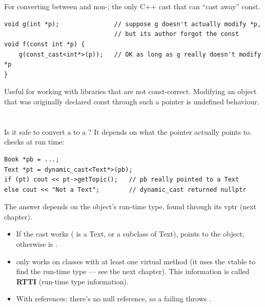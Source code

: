 \section{}
For converting between  and non-; the only C++ cast
that can ``cast away'' const.
\begin{lstlisting}[style=cpp]
void g(int *p);               // suppose g doesn't actually modify *p,
                              // but its author forgot the const
void f(const int *p) {
    g(const_cast<int*>(p));   // OK as long as g really doesn't modify *p
}
\end{lstlisting}
Useful for working with libraries that are not const-correct. Modifying an
object that was originally declared const through such a pointer is undefined
behaviour.

\section{}
Is it safe to convert a  to a ? It depends on what the
pointer actually points to.  checks at run time:
\begin{lstlisting}[style=cpp]
Book *pb = ...;
Text *pt = dynamic_cast<Text*>(pb);
if (pt) cout << pt->getTopic();   // pb really pointed to a Text
else cout << "Not a Text";        // dynamic_cast returned nullptr
\end{lstlisting}
\begin{center}

\small The answer depends on the object's run-time type, found through its vptr (next chapter).
\end{center}
\begin{itemize}
  \item If the cast works ( is a Text, or a subclass of Text),
         points to the object; otherwise  is .
  \item {} only works on classes with at least one virtual
        method (it uses the vtable to find the run-time type --- see the next
        chapter). This information is called \textbf{RTTI} (run-time type
        information).
  \item With references: there's no null reference, so a failing
         throws .
\end{itemize}

